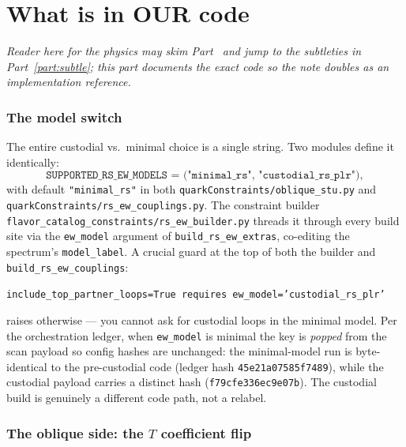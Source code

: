 \documentclass[11pt]{article}
\newcommand{\code}[1]{\texttt{#1}}
\theoremstyle{definition}
\begin{document}
\part{What is in OUR code}
\label{part:code}

\emph{Reader here for the physics may skim Part~\ref{part:code} and jump to the
subtleties in Part~\ref{part:subtle}; this part documents the exact code so the
note doubles as an implementation reference.}

\section{The model switch}
\label{sec:switch}

The entire custodial vs.\ minimal choice is a single string. Two modules define
it identically:
\begin{equation*}
\code{SUPPORTED\_RS\_EW\_MODELS = ("minimal\_rs", "custodial\_rs\_plr")},
\end{equation*}
with default \code{"minimal\_rs"} in both \code{quarkConstraints/oblique\_stu.py}
and \code{quarkConstraints/rs\_ew\_couplings.py}. The constraint builder
\code{flavor\_catalog\_constraints/rs\_ew\_builder.py} threads it through every
build site via the \code{ew\_model} argument of \code{build\_rs\_ew\_extras},
co-editing the spectrum's \code{model\_label}. A crucial guard at the top of both
the builder and \code{build\_rs\_ew\_couplings}:
\begin{center}
\code{include\_top\_partner\_loops=True requires ew\_model='custodial\_rs\_plr'}
\end{center}
raises otherwise --- you cannot ask for custodial loops in the minimal model. Per
the orchestration ledger, when \code{ew\_model} is minimal the key is
\emph{popped} from the scan payload so config hashes are unchanged: the
minimal-model run is byte-identical to the pre-custodial code (ledger hash
\code{45e21a07585f7489}), while the custodial payload carries a distinct hash
(\code{f79cfe336ec9e07b}). The custodial build is genuinely a different code path,
not a relabel.

\section{The oblique side: the $T$ coefficient flip}
\label{sec:codeT}
\end{document}
